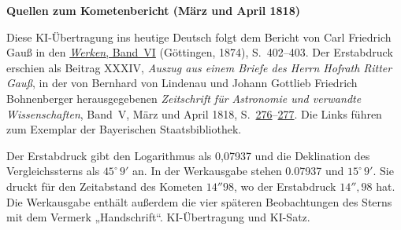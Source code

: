 \clearpage\thispagestyle{empty}
\begin{center}\textbf{Quellen zum Kometenbericht (März und April 1818)}\end{center}
\noindent Diese KI-Übertragung ins heutige Deutsch folgt dem Bericht von Carl Friedrich Gauß in den \href{https://gdz.sub.uni-goettingen.de/id/PPN236007467}{\textit{Werken}, Band~VI} (Göttingen, 1874), S.~402--403. Der Erstabdruck erschien als Beitrag XXXIV, \textit{Auszug aus einem Briefe des Herrn Hofrath Ritter Gauß}, in der von Bernhard von Lindenau und Johann Gottlieb Friedrich Bohnenberger herausgegebenen \textit{Zeitschrift für Astronomie und verwandte Wissenschaften}, Band~V, März und April 1818, S.~\href{https://api.digitale-sammlungen.de/iiif/image/v2/bsb10061007_00286/full/1600,/0/default.jpg}{276}--\href{https://api.digitale-sammlungen.de/iiif/image/v2/bsb10061007_00287/full/1600,/0/default.jpg}{277}. Die Links führen zum Exemplar der Bayerischen Staatsbibliothek.
\par\smallskip\noindent Der Erstabdruck gibt den Logarithmus als 0,07937 und die Deklination des Vergleichssterns als $45^\circ\,9'$ an. In der Werkausgabe stehen 0.07937 und $15^\circ\,9'$. Sie druckt für den Zeitabstand des Kometen $14''98$, wo der Erstabdruck $14''{,}98$ hat. Die Werkausgabe enthält außerdem die vier späteren Beobachtungen des Sterns mit dem Vermerk „Handschrift“. KI-Übertragung und KI-Satz.
\clearpage
